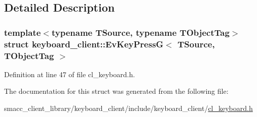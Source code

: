 \subsection{Detailed Description}
\subsubsection*{template$<$typename T\+Source, typename T\+Object\+Tag$>$\newline
struct keyboard\+\_\+client\+::\+Ev\+Key\+Press\+G$<$ T\+Source, T\+Object\+Tag $>$}



Definition at line 47 of file cl\+\_\+keyboard.\+h.



The documentation for this struct was generated from the following file\+:\begin{DoxyCompactItemize}
\item 
smacc\+\_\+client\+\_\+library/keyboard\+\_\+client/include/keyboard\+\_\+client/\hyperlink{cl__keyboard_8h}{cl\+\_\+keyboard.\+h}\end{DoxyCompactItemize}
